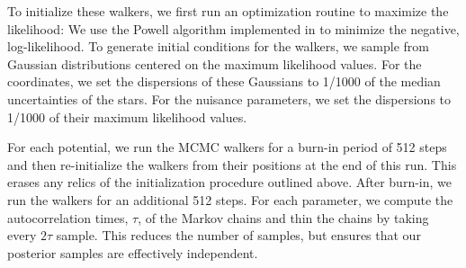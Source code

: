 \documentclass[letterpaper,12pt,preprint]{aastex}
\begin{document}
To initialize these walkers, we first run an optimization routine to maximize the likelihood: We use the Powell algorithm implemented in  \citep{powell64, scipy} to minimize the negative, log-likelihood. To generate initial conditions for the walkers, we sample from Gaussian distributions centered on the maximum likelihood values. For the coordinates, we set the dispersions of these Gaussians to 1/1000 of the median uncertainties of the stars. For the nuisance parameters, we set the dispersions to 1/1000 of their maximum likelihood values. 

For each potential, we run the MCMC walkers for a burn-in period of 512 steps and then re-initialize the walkers from their positions at the end of this run. This erases any relics of the initialization procedure outlined above. After burn-in, we run the walkers for an additional 512 steps. For each parameter, we compute the autocorrelation times, $\tau$, of the Markov chains and thin the chains by taking every $2\tau$ sample. This reduces the number of samples, but ensures that our posterior samples are effectively independent. 
\end{document}
